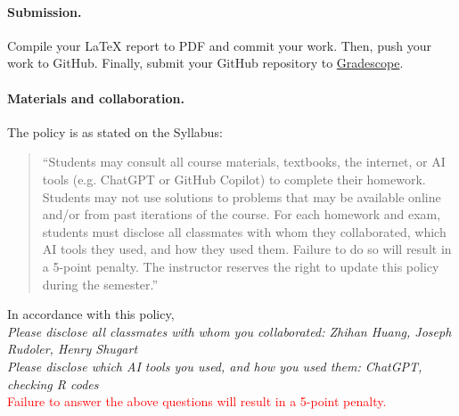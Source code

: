 \documentclass[11pt,letterpaper,english,oneside]{article} %
\theoremstyle{definition} %
\begin{document}
\paragraph{Submission.} Compile your LaTeX report to PDF and commit your work. Then, push your work to GitHub. Finally, submit your GitHub repository to \href{https://www.gradescope.com/courses/589902}{Gradescope}.

\paragraph{Materials and collaboration.} The policy is as stated on the Syllabus:

\begin{quote}
``Students may consult all course materials, textbooks, the internet, or AI tools (e.g. ChatGPT or GitHub Copilot) to complete their homework. Students may not use solutions to problems that may be available online and/or from past iterations of the course. For each homework and exam, students must disclose all classmates with whom they collaborated, which AI tools they used, and how they used them. Failure to do so will result in a 5-point penalty. The instructor reserves the right to update this policy during the semester.''
\end{quote}

\noindent In accordance with this policy, \\

\noindent \textit{Please disclose all classmates with whom you collaborated: Zhihan Huang, Joseph Rudoler, Henry Shugart} \\

\noindent \textit{Please disclose which AI tools you used, and how you used them: ChatGPT, checking R codes} \\

\noindent \textcolor{red}{Failure to answer the above questions will result in a 5-point penalty.}

\clearpage
\end{document}
